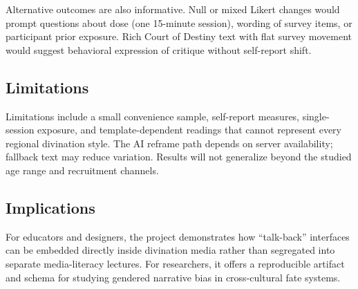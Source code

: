 \documentclass[stu,12pt,floatsintext]{apa7}
\begin{document}
Alternative outcomes are also informative. Null or mixed Likert changes would prompt questions about dose (one 15-minute session), wording of survey items, or participant prior exposure. Rich Court of Destiny text with flat survey movement would suggest behavioral expression of critique without self-report shift.

\subsection{Limitations}

Limitations include a small convenience sample, self-report measures, single-session exposure, and template-dependent readings that cannot represent every regional divination style. The AI reframe path depends on server availability; fallback text may reduce variation. Results will not generalize beyond the studied age range and recruitment channels.

\subsection{Implications}

For educators and designers, the project demonstrates how ``talk-back'' interfaces can be embedded directly inside divination media rather than segregated into separate media-literacy lectures. For researchers, it offers a reproducible artifact and schema for studying gendered narrative bias in cross-cultural fate systems.

\printbibliography
\end{document}
